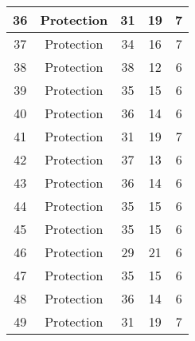 \documentclass[results.tex]{subfiles}
\begin{document}
\begin{center}
\begin{tabular}{| c || c | c | c | c |}
            \hline
            36                      & Protection                   & 31                     & 19                      & 7                    \\
            \hline
            37                      & Protection                   & 34                     & 16                      & 7                    \\
            \hline
            38                      & Protection                   & 38                     & 12                      & 6                    \\
            \hline
            39                      & Protection                   & 35                     & 15                      & 6                    \\
            \hline
            40                      & Protection                   & 36                     & 14                      & 6                    \\
            \hline
            41                      & Protection                   & 31                     & 19                      & 7                    \\
            \hline
            42                      & Protection                   & 37                     & 13                      & 6                    \\
            \hline
            43                      & Protection                   & 36                     & 14                      & 6                    \\
            \hline
            44                      & Protection                   & 35                     & 15                      & 6                    \\
            \hline
            45                      & Protection                   & 35                     & 15                      & 6                    \\
            \hline
            46                      & Protection                   & 29                     & 21                      & 6                    \\
            \hline
            47                      & Protection                   & 35                     & 15                      & 6                    \\
            \hline
            48                      & Protection                   & 36                     & 14                      & 6                    \\
            \hline
            49                      & Protection                   & 31                     & 19                      & 7                    \\
            \hline
        \end{tabular}
    \end{center}
\end{document}
